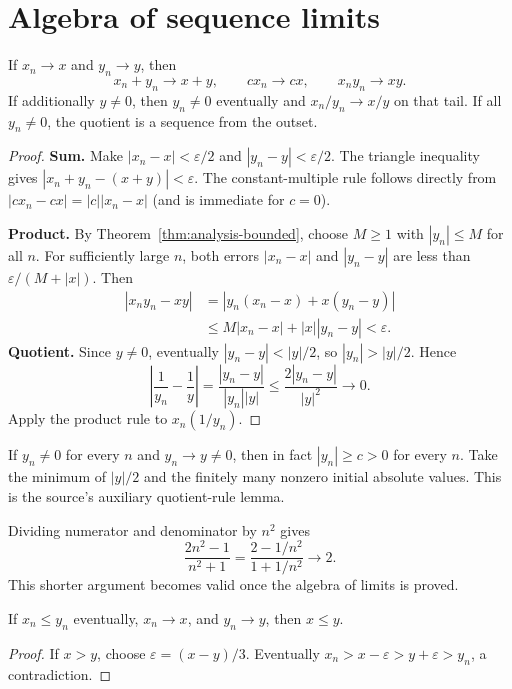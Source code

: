 \section{Algebra of sequence limits}
\begin{theorem}\label{thm:analysis-limit-algebra}
If $x_n\to x$ and $y_n\to y$, then
\[
x_n+y_n\to x+y,\qquad cx_n\to cx,\qquad x_ny_n\to xy.
\]
If additionally $y\ne0$, then $y_n\ne0$ eventually and $x_n/y_n\to x/y$
on that tail. If all $y_n\ne0$, the quotient is a sequence from the outset.
\end{theorem}
\begin{proof}
\textbf{Sum.} Make $|x_n-x|<\varepsilon/2$ and $|y_n-y|<\varepsilon/2$.
The triangle inequality gives
$|x_n+y_n-(x+y)|<\varepsilon$. The constant-multiple rule follows directly
from $|cx_n-cx|=|c||x_n-x|$ (and is immediate for $c=0$).

\textbf{Product.} By Theorem~\ref{thm:analysis-bounded}, choose $M\geq1$
with $|y_n|\leq M$ for all $n$. For sufficiently large $n$, both errors
$|x_n-x|$ and $|y_n-y|$ are less than $\varepsilon/(M+|x|)$. Then
\begin{align*}
|x_ny_n-xy|
&=|y_n(x_n-x)+x(y_n-y)|\\
&\leq M|x_n-x|+|x||y_n-y|<\varepsilon.
\end{align*}
\textbf{Quotient.} Since $y\ne0$, eventually
$|y_n-y|<|y|/2$, so $|y_n|>|y|/2$. Hence
\[
\left|\frac1{y_n}-\frac1y\right|
=\frac{|y_n-y|}{|y_n||y|}
\leq\frac{2|y_n-y|}{|y|^2}\longrightarrow0.
\]
Apply the product rule to $x_n(1/y_n)$.
\end{proof}
\begin{remark}
If $y_n\ne0$ for every $n$ and $y_n\to y\ne0$, then in fact $|y_n|\geq c>0$
for every $n$. Take the minimum of $|y|/2$ and the finitely many nonzero
initial absolute values. This is the source's auxiliary quotient-rule lemma.
\end{remark}
\begin{example}
Dividing numerator and denominator by $n^2$ gives
\[
\frac{2n^2-1}{n^2+1}=\frac{2-1/n^2}{1+1/n^2}\longrightarrow2.
\]
This shorter argument becomes valid once the algebra of limits is proved.
\end{example}
\begin{proposition}
If $x_n\leq y_n$ eventually, $x_n\to x$, and $y_n\to y$, then $x\leq y$.
\end{proposition}
\begin{proof}
If $x>y$, choose $\varepsilon=(x-y)/3$. Eventually
$x_n>x-\varepsilon>y+\varepsilon>y_n$, a contradiction.
\end{proof}

